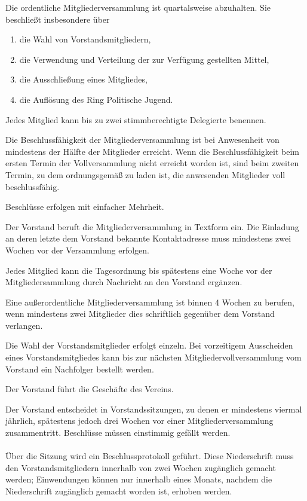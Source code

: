 \documentclass[10pt,a4paper,oneside,parskip=half]{scrartcl}
\begin{document}
\begin{contract}
Die ordentliche Mitgliederversammlung ist quartalsweise abzuhalten. Sie beschließt insbesondere über %
\begin{enumerate}
\item die Wahl von Vorstandsmitgliedern,
\item die Verwendung und Verteilung der zur Verfügung gestellten Mittel, %
\item die Ausschließung eines Mitgliedes,
\item die Auflösung des Ring Politische Jugend.
\end{enumerate}

Jedes Mitglied kann bis zu zwei stimmberechtigte Delegierte benennen.

Die Beschlussfähigkeit der Mitgliederversammlung ist bei Anwesenheit von mindestens der Hälfte der Mitglieder erreicht. Wenn die Beschlussfähigkeit beim ersten Termin der Vollversammlung nicht erreicht worden ist, sind beim zweiten Termin, zu dem ordnungsgemäß zu laden ist, die anwesenden Mitglieder voll beschlussfähig.

Beschlüsse erfolgen mit einfacher Mehrheit.

Der Vorstand beruft die Mitgliederversammlung in Textform ein. Die Einladung an deren letzte dem Vorstand bekannte Kontaktadresse muss mindestens zwei Wochen vor der Versammlung erfolgen.

Jedes Mitglied kann die Tagesordnung bis spätestens eine Woche vor der Mitgliedersammlung durch Nachricht an den Vorstand ergänzen.

Eine außerordentliche Mitgliederversammlung ist binnen 4 Wochen zu berufen, wenn mindestens zwei Mitglieder dies schriftlich gegenüber dem Vorstand verlangen. %

Die Wahl der Vorstandsmitglieder erfolgt einzeln. Bei vorzeitigem Ausscheiden eines Vorstandsmitgliedes kann bis zur nächsten Mitgliedervollversammlung vom Vorstand ein Nachfolger bestellt werden.

Der Vorstand führt die Geschäfte des Vereins. 

Der Vorstand entscheidet in Vorstandssitzungen, zu denen er mindestens viermal jährlich, spätestens jedoch drei Wochen vor einer Mitgliederversammlung zusammentritt. Beschlüsse müssen einstimmig gefällt werden.\\
\\
Über die Sitzung wird ein Beschlussprotokoll geführt. Diese Niederschrift muss den Vorstandsmitgliedern innerhalb von zwei Wochen zugänglich gemacht werden; Einwendungen können nur innerhalb eines Monats, nachdem die Niederschrift zugänglich gemacht worden ist, erhoben werden. %


\end{contract}
\end{document}
